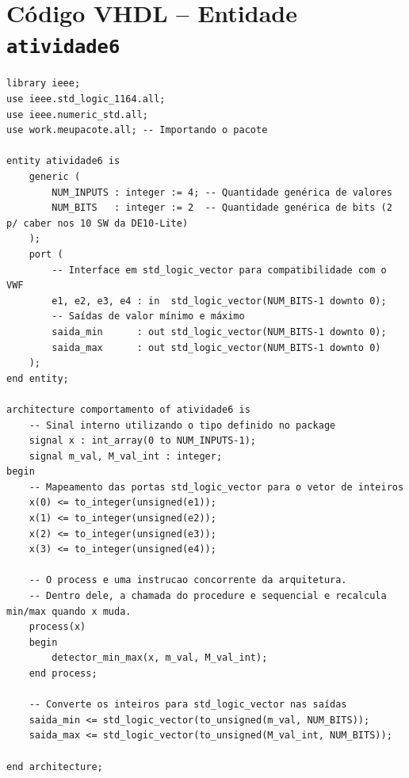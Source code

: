 \documentclass[12pt,a4paper, brazil]{article}
\begin{document}
\newpage
\section{Código VHDL -- Entidade \texttt{atividade6}}
\label{ap:codigo-top}

\begin{lstlisting}[style=vhdl, caption={Arquivo \texttt{atividade6.vhd}.}]
library ieee;
use ieee.std_logic_1164.all;
use ieee.numeric_std.all;
use work.meupacote.all; -- Importando o pacote

entity atividade6 is
    generic (
        NUM_INPUTS : integer := 4; -- Quantidade genérica de valores
        NUM_BITS   : integer := 2  -- Quantidade genérica de bits (2 p/ caber nos 10 SW da DE10-Lite)
    );
    port (
        -- Interface em std_logic_vector para compatibilidade com o VWF
        e1, e2, e3, e4 : in  std_logic_vector(NUM_BITS-1 downto 0);
        -- Saídas de valor mínimo e máximo
        saida_min      : out std_logic_vector(NUM_BITS-1 downto 0);
        saida_max      : out std_logic_vector(NUM_BITS-1 downto 0)
    );
end entity;

architecture comportamento of atividade6 is
    -- Sinal interno utilizando o tipo definido no package
    signal x : int_array(0 to NUM_INPUTS-1);
    signal m_val, M_val_int : integer;
begin
    -- Mapeamento das portas std_logic_vector para o vetor de inteiros
    x(0) <= to_integer(unsigned(e1));
    x(1) <= to_integer(unsigned(e2));
    x(2) <= to_integer(unsigned(e3));
    x(3) <= to_integer(unsigned(e4));

    -- O process e uma instrucao concorrente da arquitetura.
    -- Dentro dele, a chamada do procedure e sequencial e recalcula min/max quando x muda.
    process(x)
    begin
        detector_min_max(x, m_val, M_val_int);
    end process;

    -- Converte os inteiros para std_logic_vector nas saídas
    saida_min <= std_logic_vector(to_unsigned(m_val, NUM_BITS));
    saida_max <= std_logic_vector(to_unsigned(M_val_int, NUM_BITS));

end architecture;
\end{lstlisting}
\end{document}
